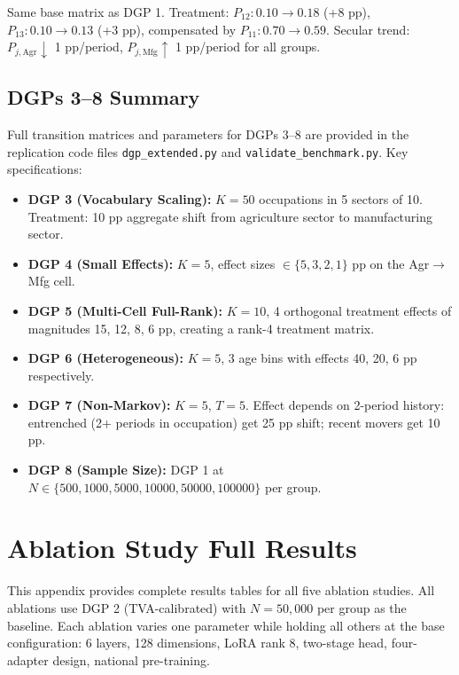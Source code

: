 \documentclass[12pt]{article}
\begin{document}
Same base matrix as DGP 1. Treatment: $P_{12}: 0.10 \to 0.18$ (+8 pp), $P_{13}: 0.10 \to 0.13$ (+3 pp), compensated by $P_{11}: 0.70 \to 0.59$. Secular trend: $P_{j,\text{Agr}} \downarrow$ 1 pp/period, $P_{j,\text{Mfg}} \uparrow$ 1 pp/period for all groups.

\subsection{DGPs 3--8 Summary}

Full transition matrices and parameters for DGPs 3--8 are provided in the replication code files \texttt{dgp\_extended.py} and \texttt{validate\_benchmark.py}. Key specifications:
\begin{itemize}
\item \textbf{DGP 3 (Vocabulary Scaling):} $K = 50$ occupations in 5 sectors of 10. Treatment: 10 pp aggregate shift from agriculture sector to manufacturing sector.
\item \textbf{DGP 4 (Small Effects):} $K = 5$, effect sizes $\in \{5, 3, 2, 1\}$ pp on the Agr$\to$Mfg cell.
\item \textbf{DGP 5 (Multi-Cell Full-Rank):} $K = 10$, 4 orthogonal treatment effects of magnitudes 15, 12, 8, 6 pp, creating a rank-4 treatment matrix.
\item \textbf{DGP 6 (Heterogeneous):} $K = 5$, 3 age bins with effects 40, 20, 6 pp respectively.
\item \textbf{DGP 7 (Non-Markov):} $K = 5$, $T = 5$. Effect depends on 2-period history: entrenched (2+ periods in occupation) get 25 pp shift; recent movers get 10 pp.
\item \textbf{DGP 8 (Sample Size):} DGP 1 at $N \in \{500, 1000, 5000, 10000, 50000, 100000\}$ per group.
\end{itemize}


\section{Ablation Study Full Results}\label{app:ablation}

This appendix provides complete results tables for all five ablation studies. All ablations use DGP 2 (TVA-calibrated) with $N = 50,000$ per group as the baseline. Each ablation varies one parameter while holding all others at the base configuration: 6 layers, 128 dimensions, LoRA rank 8, two-stage head, four-adapter design, national pre-training.
\end{document}
